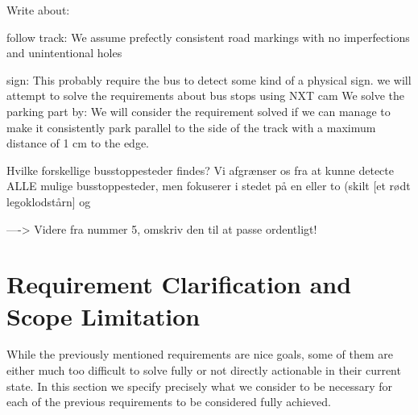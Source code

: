 
Write about:


follow track: We assume prefectly consistent road markings with no imperfections and unintentional holes

sign: This probably require the bus to detect some kind of a physical sign.
we will attempt to solve the requirements about bus stops using NXT cam
We solve the parking part by:
We will consider the requirement solved if we can manage to make it consistently park parallel to the side of the track with a maximum distance of 1 cm to the edge. 

Hvilke forskellige busstoppesteder findes?
Vi afgrænser os fra at kunne detecte ALLE mulige busstoppesteder, men fokuserer i stedet på en eller to (skilt [et rødt legoklodstårn] og 



----> Videre fra nummer 5, omskriv den til at passe ordentligt!




\section{Requirement Clarification and Scope Limitation}
While the previously mentioned requirements are nice goals, some of them are either much too difficult to solve fully or not directly actionable in their current state. In this section we specify precisely what we consider to be necessary for each of the previous requirements to be considered fully achieved.

